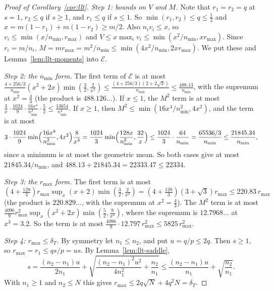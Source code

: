 \begin{proof}[Proof of Corollary~\ref{cor:llt}]
\emph{Step 1: bounds on $V$ and $M$.} Note that $r_1=r_2=q$ at $s=1$, $r_2\le q$ if $s\ge1$, and $r_1\le q$ if $s\le1$. So
$\min(r_1,r_2)\le q\le\frac12$ and $x=m(1-r_1)+m(1-r_2)\ge m/2$. Also $n_iv_i\le x$, so
$v_i\le\min(x/n_{\min},r_{\max})$ and $V\le x\max_iv_i\le\min(x^2/n_{\min},xr_{\max})$. Since
$r_i=m/n_i$, $M=mr_{\max}=m^2/n_{\min}\le\min(4x^2/n_{\min},2xr_{\max})$. We put these and
Lemma~\ref{lem:llt-moments} into $\mathcal E$.

\emph{Step 2: the $n_{\min}$ form.} The first term of $\mathcal E$ is at most
$\frac{4+256/3}{n_{\min}}(x^2+2x)\min(\frac32,\frac2{x^2})\le\frac{(4+256/3)(2+2\sqrt3)}{n_{\min}}
\le\frac{488.13}{n_{\min}}$, with the supremum at $x^2=\frac43$ (the product is $488.126\ldots$).
If $x\le1$, the $M^2$ term is at most
$\frac3x\cdot\frac{1024}9\cdot\frac{16x^4}{n_{\min}^2}\cdot\frac52\le\frac{13654}{n_{\min}^2}$. If
$x\ge1$, then $M^2\le\min(16x^4/n_{\min}^2,4x^2)$, and the term is at most
\[
3\cdot\frac{1024}9\min\Bigl(\frac{16x^4}{n_{\min}^2},4x^2\Bigr)\frac8{x^3}
=\frac{1024}3\min\Bigl(\frac{128x}{n_{\min}^2},\frac{32}x\Bigr)\le\frac{1024}3\cdot\frac{64}{n_{\min}}
=\frac{65536/3}{n_{\min}}\le\frac{21845.34}{n_{\min}},
\]
since a minimum is at most the geometric mean. So both cases give at most
$21845.34/n_{\min}$, and $488.13+21845.34=22333.47\le22334$.

\emph{Step 3: the $r_{\max}$ form.} The first term is at most
$(4+\frac{128}3)r_{\max}\sup_x(x+2)\min(\frac32,\frac2{x^2})=(4+\frac{128}3)(3+\sqrt3)r_{\max}
\le220.83\,r_{\max}$ (the product is $220.829\ldots$, with the supremum at $x^2=\frac43$). The
$M^2$ term is at most $\frac{4096}9r_{\max}^2\sup_x(x^2+2x)\min(\frac52,\frac8{x^3})$, where the
supremum is $12.7968\ldots$ at $x^3=3.2$. So the term is at most
$\frac{4096}9\cdot12.797\,r_{\max}^2\le5825\,r_{\max}^2$.

\emph{Step 4: $r_{\max}\le\delta_T$.} By symmetry let $n_1\le n_2$, and put
$u=q/p\le2q$. Then $s\ge1$, so
$r_{\max}=r_1\le qs/p=us$. By Lemma~\ref{lem:llt-saddle},
\[
s=\frac{(n_2-n_1)u}{2n_1}+\sqrt{\frac{(n_2-n_1)^2u^2}{4n_1^2}+\frac{n_2}{n_1}}
\le\frac{(n_2-n_1)u}{n_1}+\sqrt{\frac{n_2}{n_1}}.
\]
With $n_1\ge1$ and $n_2\le N$ this gives $r_{\max}\le2q\sqrt N+4q^2N=\delta_T$.
\end{proof}
